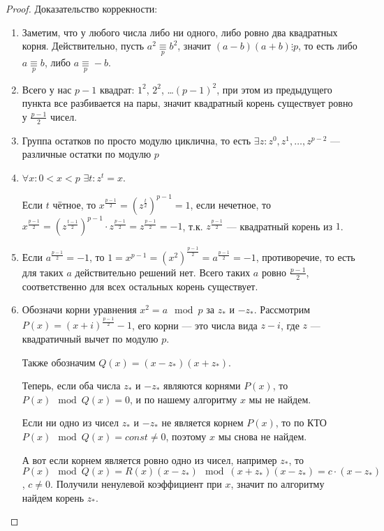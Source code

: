 \begin{enumerate}
	    \begin{proof}
	
	    	Доказательство коррекности:

		    \begin{enumerate}
				\item
					Заметим, что у любого числа либо ни одного, либо ровно два квадратных корня.
					Действительно, пусть $a^2 \underset{p}{\equiv} b^2$, значит $(a-b)(a+b) \vdots p$, то есть либо $a \underset{p}{\equiv} b$, либо $a \underset{p}{\equiv} -b$.

				\item
					Всего у нас $p-1$ квадрат: $1^2$, $2^2$, \dots $(p-1)^2$, при этом из предыдущего пункта все разбивается на пары, 
					значит квадратный корень существует ровно у $\frac{p-1}{2}$ чисел.

				\item
					Группа остатков по просто модулю циклична, то есть $\exists z: z^0, z^1, \dots, z^{p-2}$ --- различные остатки по модулю $p$

				\item	
					$\forall x: 0 < x < p$ $\exists t: z^t = x$.

					Если $t$ чётное, то $x^\frac{p-1}{2} = (z^\frac{t}{2})^{p-1} = 1$, 
					если нечетное, то $x^\frac{p-1}{2} = (z^\frac{t-1}{2})^{p-1} \cdot z^\frac{p-1}{2} = z^\frac{p-1}{2} = -1$, т.к. $z^\frac{p-1}{2}$ --- квадратный корень из $1$.

				\item
					Если $a^\frac{p-1}{2} = -1$, то $1 = x^{p-1} = (x^2)^\frac{p-1}{2} = a^\frac{p-1}{2} = -1$, противоречие, то есть для таких $a$ действительно решений нет.
					Всего таких $a$ ровно $\frac{p-1}{2}$, соответственно для всех остальных корень существует.

				\item
					Обозначи корни уравнения $x^2=a \mod p$ за $z_*$ и $-z_*$.
					Рассмотрим $P(x) = (x+i)^\frac{p-1}{2} - 1$, его корни --- это числа вида $z-i$, где $z$ --- квадратичный вычет по модулю $p$.

					Также обозначим $Q(x)=(x-z_*)(x+z_*)$.

					Теперь, если оба числа $z_*$ и $-z_*$ являются корнями $P(x)$, то $P(x) \mod Q(x) = 0$, и по нашему алгоритму $x$ мы не найдем.
					
					Если ни одно из чисел $z_*$ и $-z_*$ не является корнем $P(x)$, то по КТО $P(x) \mod Q(x) = const \ne 0$, поэтому $x$ мы снова не найдем.

					А вот если корнем является ровно одно из чисел, например $z_*$, то $P(x) \mod Q(x) = R(x)(x-z_*) \mod (x+z_*)(x-z_*) = c \cdot (x-z_*)$, $c \ne 0$.
					Получили ненулевой коэффициент при $x$, значит по алгоритму найдем корень $z_*$.
		    \end{enumerate}


\end{proof}
\end{enumerate}
